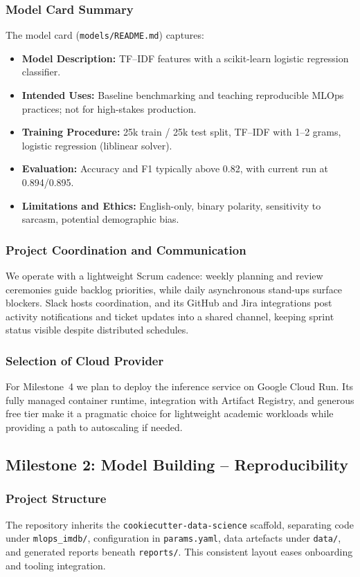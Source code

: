 \documentclass[11pt,a4paper]{article}
\begin{document}
\subsubsection{Model Card Summary}
The model card (\texttt{models/README.md}) captures:\begin{itemize}[leftmargin=*]
  \item \textbf{Model Description:} TF--IDF features with a scikit-learn logistic regression classifier.
  \item \textbf{Intended Uses:} Baseline benchmarking and teaching reproducible MLOps practices; not for high-stakes production.
  \item \textbf{Training Procedure:} 25k train / 25k test split, TF--IDF with 1--2 grams, logistic regression (liblinear solver).
  \item \textbf{Evaluation:} Accuracy and F1 typically above 0.82, with current run at 0.894/0.895.
  \item \textbf{Limitations and Ethics:} English-only, binary polarity, sensitivity to sarcasm, potential demographic bias.
\end{itemize}

\subsubsection{Project Coordination and Communication}
We operate with a lightweight Scrum cadence: weekly planning and review ceremonies guide backlog priorities, while daily asynchronous stand-ups surface blockers. Slack hosts coordination, and its GitHub and Jira integrations post activity notifications and ticket updates into a shared channel, keeping sprint status visible despite distributed schedules.

\subsubsection{Selection of Cloud Provider}
For Milestone~4 we plan to deploy the inference service on Google Cloud Run. Its fully managed container runtime, integration with Artifact Registry, and generous free tier make it a pragmatic choice for lightweight academic workloads while providing a path to autoscaling if needed.

\subsection{Milestone 2: Model Building -- Reproducibility}\label{subsec:milestone2}
\subsubsection{Project Structure}
The repository inherits the \texttt{cookiecutter-data-science} scaffold, separating code under \texttt{mlops\_imdb/}, configuration in \texttt{params.yaml}, data artefacts under \texttt{data/}, and generated reports beneath \texttt{reports/}. This consistent layout eases onboarding and tooling integration.
\end{document}

